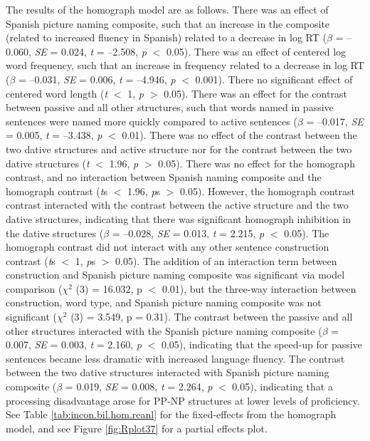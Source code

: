 The results of the homograph model are as follows. There was an effect of Spanish picture naming composite, such that an increase in the composite (related to increased fluency in Spanish) related to a decrease in log RT (\emph{$\beta$} = --0.060, \emph{SE} = 0.024, \emph{t} = --2.508, \emph{p} $<$ 0.05). There was an effect of centered log word frequency, such that an increase in frequency related to a decrease in log RT (\emph{$\beta$} = --0.031, \emph{SE} = 0.006, \emph{t} = --4.946, \emph{p} $<$ 0.001). There no significant effect of centered word length (\emph{t} $<$ 1, \emph{p $>$} 0.05). There was an effect for the contrast between passive and all other structures, such that words named in passive sentences were named more quickly compared to active sentences (\emph{$\beta$} = --0.017, \emph{SE} = 0.005, \emph{t} = --3.438, \emph{p} $<$ 0.01). There was no effect of the contrast between the two dative structures and active structure nor for the contrast between the two dative structures (\emph{t} $<$ 1.96, \emph{p} $>$ 0.05). There was no effect for the homograph contrast, and no interaction between Spanish naming composite and the homograph contrast (\emph{t}s $<$ 1.96, \emph{p}s $>$ 0.05). However, the homograph contrast contrast interacted with the contrast between the active structure and the two dative structures, indicating that there was significant homograph inhibition in the dative structures (\emph{$\beta$} = --0.028, \emph{SE} = 0.013, \emph{t} = 2.215, \emph{p} $<$ 0.05). The homograph contrast did not interact with any other sentence construction contrast (\emph{t}s $<$ 1, \emph{p}s $>$ 0.05). The addition of an interaction term between construction and Spanish picture naming composite was significant via model comparison ($\chi^2$ (3) = 16.032, p $<$ 0.01), but the three-way interaction between construction, word type, and Spanish picture naming composite was not significant ($\chi^2$ (3) = 3.549, p = 0.31). The contrast between the passive and all other structures interacted with the Spanish picture naming composite (\emph{$\beta$} = 0.007, \emph{SE} = 0.003, \emph{t} = 2.160, \emph{p} $<$ 0.05), indicating that the speed-up for passive sentences became less dramatic with increased language fluency. The contrast between the two dative structures interacted with Spanish picture naming composite (\emph{$\beta$} = 0.019, \emph{SE} = 0.008, \emph{t} = 2.264, \emph{p} $<$ 0.05), indicating that a processing disadvantage arose for PP-NP structures at lower levels of proficiency. See Table \ref{tab:incon.bil.hom.reanl} for the fixed-effects from the homograph model, and see Figure \ref{fig:Rplot37} for a partial effects plot. 
